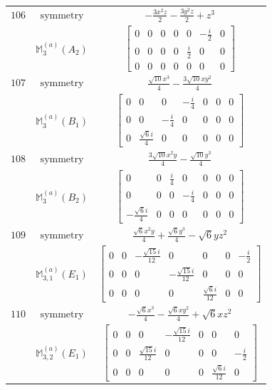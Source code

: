 \documentclass[fleqn,8pt,landscape]{jsarticle}
\begin{document}
\begin{longtable}{ccc}
$ 106 $ & $ \text{symmetry} $ & $ - \frac{3 x^{2} z}{2} - \frac{3 y^{2} z}{2} + z^{3} $ \\
$  $ & $ \mathbb{M}_{3}^{(a)}(A_{2}) $ & $ \begin{bmatrix} 0 & 0 & 0 & 0 & 0 & - \frac{i}{2} & 0 \\ 0 & 0 & 0 & 0 & \frac{i}{2} & 0 & 0 \\ 0 & 0 & 0 & 0 & 0 & 0 & 0 \end{bmatrix} $ \\ \hline
$ 107 $ & $ \text{symmetry} $ & $ \frac{\sqrt{10} x^{3}}{4} - \frac{3 \sqrt{10} x y^{2}}{4} $ \\
$  $ & $ \mathbb{M}_{3}^{(a)}(B_{1}) $ & $ \begin{bmatrix} 0 & 0 & 0 & - \frac{i}{4} & 0 & 0 & 0 \\ 0 & 0 & - \frac{i}{4} & 0 & 0 & 0 & 0 \\ 0 & \frac{\sqrt{6} i}{4} & 0 & 0 & 0 & 0 & 0 \end{bmatrix} $ \\ \hline
$ 108 $ & $ \text{symmetry} $ & $ \frac{3 \sqrt{10} x^{2} y}{4} - \frac{\sqrt{10} y^{3}}{4} $ \\
$  $ & $ \mathbb{M}_{3}^{(a)}(B_{2}) $ & $ \begin{bmatrix} 0 & 0 & \frac{i}{4} & 0 & 0 & 0 & 0 \\ 0 & 0 & 0 & - \frac{i}{4} & 0 & 0 & 0 \\ - \frac{\sqrt{6} i}{4} & 0 & 0 & 0 & 0 & 0 & 0 \end{bmatrix} $ \\ \hline
$ 109 $ & $ \text{symmetry} $ & $ \frac{\sqrt{6} x^{2} y}{4} + \frac{\sqrt{6} y^{3}}{4} - \sqrt{6} y z^{2} $ \\
$  $ & $ \mathbb{M}_{3,1}^{(a)}(E_{1}) $ & $ \begin{bmatrix} 0 & 0 & - \frac{\sqrt{15} i}{12} & 0 & 0 & 0 & - \frac{i}{2} \\ 0 & 0 & 0 & - \frac{\sqrt{15} i}{12} & 0 & 0 & 0 \\ 0 & 0 & 0 & 0 & \frac{\sqrt{6} i}{12} & 0 & 0 \end{bmatrix} $ \\ \hline
$ 110 $ & $ \text{symmetry} $ & $ - \frac{\sqrt{6} x^{3}}{4} - \frac{\sqrt{6} x y^{2}}{4} + \sqrt{6} x z^{2} $ \\
$  $ & $ \mathbb{M}_{3,2}^{(a)}(E_{1}) $ & $ \begin{bmatrix} 0 & 0 & 0 & - \frac{\sqrt{15} i}{12} & 0 & 0 & 0 \\ 0 & 0 & \frac{\sqrt{15} i}{12} & 0 & 0 & 0 & - \frac{i}{2} \\ 0 & 0 & 0 & 0 & 0 & \frac{\sqrt{6} i}{12} & 0 \end{bmatrix} $ \\ \hline

\end{longtable}
\end{document}

